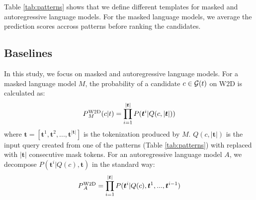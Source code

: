 \documentclass[11pt,a4paper]{article}
\def\uprm#1#2{\mbox{$_#2^{\hbox{\scriptsize #1}}$}}
\begin{document}
Table \ref{tab:patterns} shows that we define different templates for masked and autoregressive language models.
For the masked language models, we average the prediction scores accross patterns before ranking the candidates.



\subsection{Baselines}

  
In this study, we focus on masked  and
autoregressive language models. For a masked language model
$M$, the probability of a candidate $c \in {\cal G}(t)$ on W2D  is calculated as:
\begin{equation*}
  P\uprm{W2D}{M} (c|t) = \prod_{i=1}^{|\bm{t}|}P(\bm{t}^i|Q(c,|\bm{t}|))
\end{equation*}
where $\bm{t} = [\bm{t}^1, \bm{t}^2,...,\bm{t}^{|\bm{t}|}]$
is the tokenization produced by  $M$. $Q(c,|\bm{t}|)$ is the
input query
created from one of the patterns (Table \ref{tab:patterns})
with \underline{\hspace{3mm}} replaced with
$|\bm{t}|$ consecutive mask tokens. For an autoregressive
language model $A$, we
decompose $P(\bm{t}^i|Q(c),\bm{t})$ in the standard way:
\begin{equation*}
    P\uprm{W2D}{A} = \prod_{i=1}^{|\bm{t}|}P(\bm{t}^i|Q(c),\bm{t}^{1},...,\bm{t}^{i-1})
\end{equation*}
\end{document}
